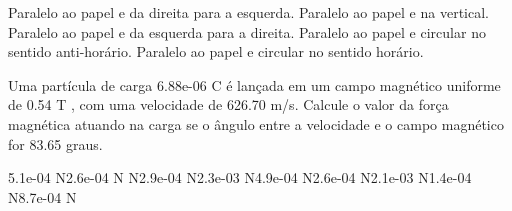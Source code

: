 \documentclass[12pt, addpoints]{exam}
\begin{document}
\begin{questions}
\begin{multicols*}{2}
\begin{choices}
\choice Paralelo ao papel e da direita para a esquerda. 
\choice Paralelo ao papel e na vertical. 
\choice Paralelo ao papel e da esquerda para a direita. 
\choice Paralelo ao papel e circular no sentido anti-horário. 
\choice Paralelo ao papel e circular no sentido horário. 
\end{choices}
\question Uma partícula de carga 6.88e-06 C é lançada em um campo magnético uniforme de    0.54 T , com uma velocidade de 626.70 m/s. Calcule o valor da força magnética atuando na carga se o ângulo entre a velocidade e o campo magnético for   83.65 graus.

\begin{oneparchoices}
\choice 5.1e-04 N\choice 2.6e-04 N N\choice 2.9e-04 N\choice 2.3e-03 N\choice 4.9e-04 N\choice 2.6e-04 N\choice 2.1e-03 N\choice 1.4e-04 N\choice 8.7e-04 N
\end{oneparchoices}\end{multicols*}
\end{questions}
\newpage
\end{document}
